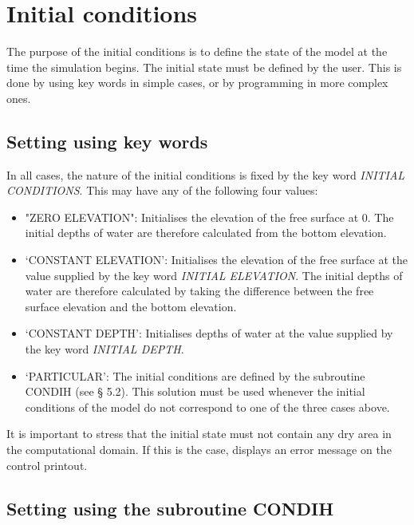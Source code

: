 \chapter{Initial conditions}

The purpose of the initial conditions is to define the state of the model at
the time the simulation begins. The initial state must be defined by the user.
This is done by using key words in simple cases, or by programming in more
complex ones.


\section{Setting using key words}

In all cases, the nature of the initial conditions is fixed by the key word
\textit{INITIAL CONDITIONS}. This may have any of the following four values:

\begin{itemize}
\item  "ZERO ELEVATION": Initialises the elevation of the free
  surface at 0. The initial depths of water are therefore calculated from the
    bottom elevation.

\item  `CONSTANT ELEVATION': Initialises the elevation of the free surface at
  the value supplied by the key word \textit{INITIAL ELEVATION}. The initial
    depths of water are therefore calculated by taking the difference between
    the free surface elevation and the bottom elevation.

\item  `CONSTANT DEPTH': Initialises depths of water at the value supplied by
  the key word \textit{INITIAL DEPTH}.

\item  `PARTICULAR': The initial conditions are defined by the subroutine
  CONDIH (see {\S} 5.2). This solution must be used whenever the initial
    conditions of the model do not correspond to one of the three cases above.
\end{itemize}

It is important to stress that the initial state must not contain any dry area
in the computational domain. If this is the case, \artemis{} displays an error
message on the control printout.


\section{Setting using the subroutine CONDIH}

